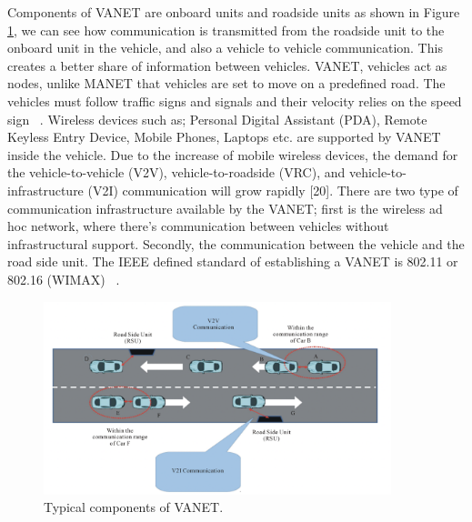 \documentclass[
  oneside,
  11pt, a4paper,
  footinclude=true,
  headinclude=true,
  cleardoublepage=empty
]{scrbook}
\begin{document}
Components of VANET are onboard units and roadside units as shown in Figure \ref{Vanets-Best-c}, we can see how communication is transmitted from the roadside unit to the onboard unit in the vehicle, and also a vehicle to vehicle communication. This creates a better share of information between vehicles.
VANET, vehicles act as nodes, unlike MANET that vehicles are set to move on a predefined road. The vehicles must follow traffic signs and signals and their velocity relies on the speed sign ~\cite{vanet2}. Wireless devices such
as; Personal Digital Assistant (PDA), Remote Keyless Entry Device, Mobile Phones, Laptops etc. are supported by VANET inside the vehicle. Due to the increase of mobile wireless devices, the demand for the vehicle-to-vehicle (V2V), vehicle-to-roadside (VRC), and vehicle-to-infrastructure (V2I) communication will
grow rapidly [20]. There are two type of communication infrastructure available by the VANET; first is the wireless ad hoc network, where there’s communication between vehicles without infrastructural support. Secondly, the communication between the vehicle and the road side unit. The IEEE defined standard of establishing a VANET is 802.11 or 802.16 (WIMAX) ~\cite{vanetusarlater}.


\begin{figure}[H]
\begin{center}
  \includegraphics[width=0.9\textwidth]{img/v3.png}
\end{center}
  \caption{Typical components of VANET. ~\cite{vanetusarlater}}
  \centering  
\label{Vanets-Best-c}
\end{figure}
\end{document}
